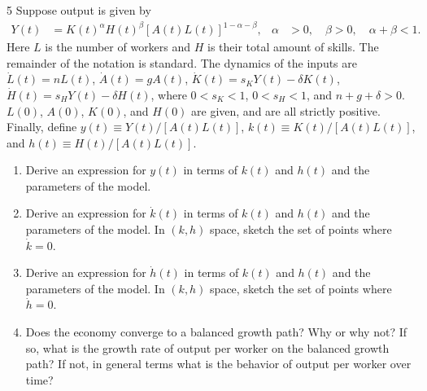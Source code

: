 \begin{problem}{5}
Suppose output is given by
\begin{align*}
    Y\left(t\right)
    &= K\left(t\right)^\alpha H\left(t\right)^\beta
       \left[A\left(t\right)L\left(t\right)\right]^{1-\alpha-\beta},
    & \alpha &> 0,\quad \beta>0,\quad \alpha+\beta<1.
\end{align*}
Here \(L\) is the number of workers and \(H\) is their total amount of skills. The remainder of the notation is standard. The dynamics of the inputs are \(\dot{L}\left(t\right)=nL\left(t\right)\), \(\dot{A}\left(t\right)=gA\left(t\right)\), \(\dot{K}\left(t\right)=s_KY\left(t\right)-\delta K\left(t\right)\), \(\dot{H}\left(t\right)=s_HY\left(t\right)-\delta H\left(t\right)\), where \(0<s_K<1\), \(0<s_H<1\), and \(n+g+\delta>0\). \(L\left(0\right)\), \(A\left(0\right)\), \(K\left(0\right)\), and \(H\left(0\right)\) are given, and are all strictly positive. Finally, define \(y\left(t\right)\equiv Y\left(t\right)/\left[A\left(t\right)L\left(t\right)\right]\), \(k\left(t\right)\equiv K\left(t\right)/\left[A\left(t\right)L\left(t\right)\right]\), and \(h\left(t\right)\equiv H\left(t\right)/\left[A\left(t\right)L\left(t\right)\right]\).
\begin{enumerate}[label=(\alph*)]
    \item Derive an expression for \(y\left(t\right)\) in terms of \(k\left(t\right)\) and \(h\left(t\right)\) and the parameters of the model.
    \item Derive an expression for \(\dot{k}\left(t\right)\) in terms of \(k\left(t\right)\) and \(h\left(t\right)\) and the parameters of the model. In \(\left(k,h\right)\) space, sketch the set of points where \(\dot{k}=0\).
    \item Derive an expression for \(\dot{h}\left(t\right)\) in terms of \(k\left(t\right)\) and \(h\left(t\right)\) and the parameters of the model. In \(\left(k,h\right)\) space, sketch the set of points where \(\dot{h}=0\).
    \item Does the economy converge to a balanced growth path? Why or why not? If so, what is the growth rate of output per worker on the balanced growth path? If not, in general terms what is the behavior of output per worker over time?
\end{enumerate}
\end{problem}

